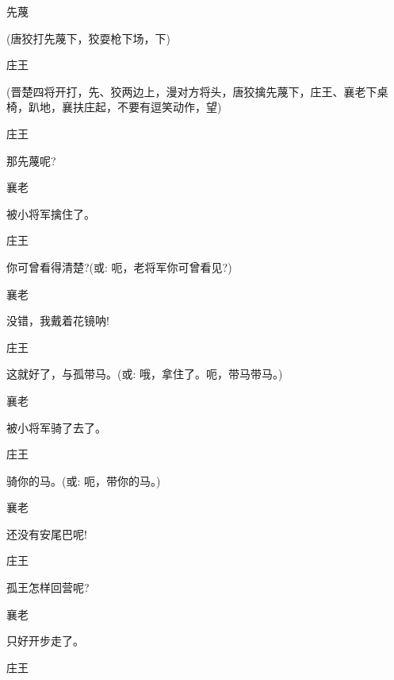 {

先蔑\hspace{30pt}~


(唐狡打先蔑下，狡耍枪下场，下)

庄王


(晋楚四将开打，先、狡两边上，漫对方将头，唐狡擒先蔑下，庄王、襄老下桌椅，趴地，襄扶庄起，不要有逗笑动作，望)

庄王\hspace{30pt}~

那先蔑呢?

襄老\hspace{30pt}~

被小将军擒住了。

庄王\hspace{30pt}~

你可曾看得清楚?({\akai 或}: 呃，老将军你可曾看见?)

襄老\hspace{30pt}~

没错，我戴着花镜呐!

庄王\hspace{30pt}~

这就好了，与孤带马。({\akai 或}: 哦，拿住了。呃，带马带马。)

襄老\hspace{30pt}~

被小将军骑了去了。

庄王\hspace{30pt}~

骑你的马。({\akai 或}: 呃，带你的马。)

襄老\hspace{30pt}~

还没有安尾巴呢!

庄王\hspace{30pt}~

孤王怎样回营呢?

襄老\hspace{30pt}~

只好开步走了。

庄王\hspace{30pt}~

}

